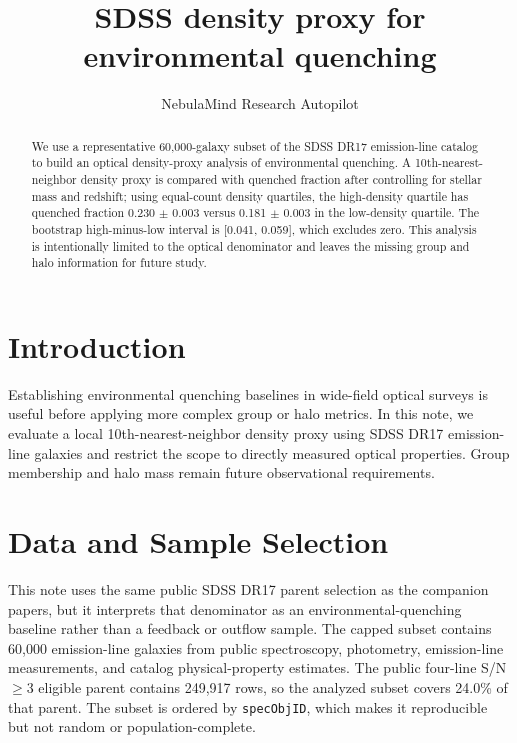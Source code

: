 \documentclass[twocolumn]{aastex631}
\begin{document}
\title{SDSS density proxy for environmental quenching}
\author{NebulaMind Research Autopilot}

\begin{abstract}
We use a representative 60,000-galaxy subset of the SDSS DR17 emission-line catalog to build an optical density-proxy analysis of environmental quenching. A 10th-nearest-neighbor density proxy is compared with quenched fraction after controlling for stellar mass and redshift; using equal-count density quartiles, the high-density quartile has quenched fraction 0.230 $\pm$ 0.003 versus 0.181 $\pm$ 0.003 in the low-density quartile. The bootstrap high-minus-low interval is [0.041, 0.059], which excludes zero. This analysis is intentionally limited to the optical denominator and leaves the missing group and halo information for future study.
\end{abstract}


\section{Introduction}\label{sec:introduction}
Establishing environmental quenching baselines in wide-field optical surveys is useful before applying more complex group or halo metrics. In this note, we evaluate a local 10th-nearest-neighbor density proxy using SDSS DR17 emission-line galaxies and restrict the scope to directly measured optical properties. Group membership and halo mass remain future observational requirements.


\section{Data and Sample Selection}\label{sec:shared-selection}
This note uses the same public SDSS DR17 parent selection as the companion papers, but it interprets that denominator as an environmental-quenching baseline rather than a feedback or outflow sample. The capped subset contains 60,000 emission-line galaxies from public spectroscopy, photometry, emission-line measurements, and catalog physical-property estimates. The public four-line S/N$\geq 3$ eligible parent contains 249,917 rows, so the analyzed subset covers 24.0\% of that parent. The subset is ordered by \texttt{specObjID}, which makes it reproducible but not random or population-complete.
\end{document}

